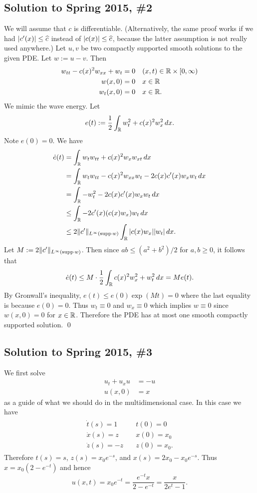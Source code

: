 \subsection*{Solution to Spring 2015, \#2}\label{s152}
We will assume that $c$ is differentiable. (Alternatively, the same proof works if we had $|c'(x)| \leq \widehat{c}$
instead of $|c(x)| \leq \widehat{c}$, because the latter assumption is not really used anywhere.) Let $u, v$ be two compactly
supported smooth solutions to the given PDE. Let $w := u - v$. Then
\begin{align*}
w_{tt} - c(x)^{2}w_{xx} + w_{t} &= 0\quad (x, t) \in \mathbb{R} \times [0, \infty)\\
w(x, 0) &= 0\quad x \in \mathbb{R}\\
w_{t}(x, 0) &= 0\quad x \in \mathbb{R}.
\end{align*}
We mimic the wave energy. Let $$e(t) := \frac{1}{2}\int_{\mathbb{R}}w_{t}^{2} + c(x)^{2}w_{x}^{2}\, dx.$$ Note $e(0) = 0$. We have
\begin{align*}
\dot{e}(t) &= \int_{\mathbb{R}}w_{t}w_{tt} + c(x)^{2}w_{x}w_{xt}\, dx\\
& = \int_{\mathbb{R}}w_{t}w_{tt} - c(x)^{2}w_{xx}w_{t} - 2c(x)c'(x)w_{x}w_{t}\, dx\\
& = \int_{\mathbb{R}}-w_{t}^{2} - 2c(x)c'(x)w_{x}w_{t}\, dx\\
& \leq \int_{\mathbb{R}}-2c'(x)(c(x)w_{x})w_{t}\, dx\\
& \leq 2\|c'\|_{L^{\infty}(\operatorname{supp} w)}\int_{\mathbb{R}}|c(x)w_{x}||w_{t}|\, dx.
\end{align*}
Let $M := 2\|c'\|_{L^{\infty}(\operatorname{supp} w)}$. Then since $ab \leq (a^{2} + b^{2})/2$ for $a, b \geq 0$, it follows that
\begin{align*}
\dot{e}(t) \leq M \cdot \frac{1}{2}\int_{\mathbb{R}}c(x)^{2}w_{x}^{2} + w_{t}^{2}\, dx = Me(t).
\end{align*}
By Gronwall's inequality,
$e(t) \leq e(0)\exp(Mt) = 0$ where the last equality is because $e(0) = 0$. Thus $w_{t} \equiv 0$ and $w_{x} \equiv 0$ which implies $w \equiv 0$ since $w(x, 0) = 0$ for $x \in \mathbb{R}$.
Therefore the PDE has at most one smooth compactly supported solution.
\hfill\qed

\subsection*{Solution to Spring 2015, \#3}\label{s153}
We first solve
\begin{align*}
u_{t} + u_{x}u &= -u\\
u(x, 0) &= x
\end{align*}
as a guide of what we should do in the multidimensional case. In this case we have
\begin{align*}
\begin{array}{ll}
\dot{t}(s) = 1 \quad &t(0) = 0\\
\dot{x}(s) = z \quad &x(0) = x_{0}\\
\dot{z}(s) = -z \quad &z(0) = x_{0}.
\end{array}
\end{align*}
Therefore $t(s) = s$, $z(s) = x_{0}e^{-s}$, and $x(s) = 2x_{0} - x_{0}e^{-s}$.
Thus $x = x_{0}(2 - e^{-t})$ and hence
$$u(x, t) = x_{0}e^{-t} = \frac{e^{-t}x}{2 - e^{-t}} = \frac{x}{2e^{t} - 1}.$$

